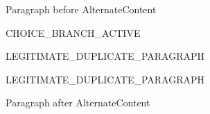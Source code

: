 \documentclass[11pt,a4paper]{article}
\begin{document}
Paragraph before AlternateContent

CHOICE\_BRANCH\_ACTIVE

LEGITIMATE\_DUPLICATE\_PARAGRAPH

LEGITIMATE\_DUPLICATE\_PARAGRAPH

Paragraph after AlternateContent
\end{document}
